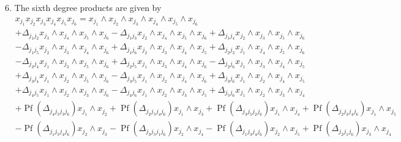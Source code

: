 \documentclass[aps, preprint]{revtex4}
\begin{document}
6. The sixth degree products are given by
\begin{align} & x_{j_{1}} x_{j_{2}} x_{j_{3}} x_{j_{4}} x_{j_{5}} x_{j_{6}} =x_{j_{1}} \wedge x_{j_{2}} \wedge x_{j_{3}} \wedge x_{j_{4}} \wedge x_{j_{5}} \wedge x_{j_{6}} \nonumber  \\
 &  + \Delta _{j_{1} j_{2}}x_{j_{3}} \wedge x_{j_{4}} \wedge x_{j_{5}} \wedge x_{j_{6}} - \Delta _{j_{1} j_{3}}x_{j_{2}} \wedge x_{j_{4}} \wedge x_{j_{5}} \wedge x_{j_{6}} + \Delta _{j_{1} j_{4}}x_{j_{2}} \wedge x_{j_{3}} \wedge x_{j_{5}} \wedge x_{j_{6}} \nonumber  \\
 &  - \Delta _{j_{1} j_{5}}x_{j_{2}} \wedge x_{j_{3}} \wedge x_{j_{4}} \wedge x_{j_{6}} + \Delta _{j_{1} j_{6}}x_{j_{2}} \wedge x_{j_{3}} \wedge x_{j_{4}} \wedge x_{j_{5}} + \Delta _{j_{2} j_{3}}x_{j_{1}} \wedge x_{j_{4}} \wedge x_{j_{5}} \wedge x_{j_{6}} \nonumber  \\
 &  - \Delta _{j_{2} j_{4}}x_{j_{1}} \wedge x_{j_{3}} \wedge x_{j_{5}} \wedge x_{j_{6}} + \Delta _{j_{2} j_{5}}x_{j_{1}} \wedge x_{j_{3}} \wedge x_{j_{4}} \wedge x_{j_{6}} - \Delta _{j_{2} j_{6}}x_{j_{1}} \wedge x_{j_{3}} \wedge x_{j_{4}} \wedge x_{j_{5}} \nonumber  \\
 &  + \Delta _{j_{3} j_{4}}x_{j_{1}} \wedge x_{j_{2}} \wedge x_{j_{5}} \wedge x_{j_{6}} - \Delta _{j_{3} j_{5}}x_{j_{1}} \wedge x_{j_{2}} \wedge x_{j_{4}} \wedge x_{j_{6}} + \Delta _{j_{3} j_{6}}x_{j_{1}} \wedge x_{j_{2}} \wedge x_{j_{4}} \wedge x_{j_{5}} \nonumber  \\
 &  + \Delta _{j_{4} j_{5}}x_{j_{1}} \wedge x_{j_{2}} \wedge x_{j_{3}} \wedge x_{j_{6}} - \Delta _{j_{4} j_{6}}x_{j_{1}} \wedge x_{j_{2}} \wedge x_{j_{3}} \wedge x_{j_{5}} + \Delta _{j_{5} j_{6}}x_{j_{1}} \wedge x_{j_{2}} \wedge x_{j_{3}} \wedge x_{j_{4}} \nonumber  \\
 &  +\ensuremath{\operatorname*{Pf}} \left ( \Delta _{j_{4} j_{5} j_{3} j_{6}}\right ) x_{j_{1}} \wedge x_{j_{2}} +\ensuremath{\operatorname*{Pf}} \left ( \Delta _{j_{2} j_{5} j_{4} j_{6}}\right ) x_{j_{1}} \wedge x_{j_{3}} +\ensuremath{\operatorname*{Pf}} \left ( \Delta _{j_{3} j_{5} j_{2} j_{6}}\right ) x_{j_{1}} \wedge x_{j_{4}} +\ensuremath{\operatorname*{Pf}} \left ( \Delta _{j_{2} j_{3} j_{4} j_{6}}\right ) x_{j_{1}} \wedge x_{j_{5}} \nonumber  \\
 &  -\ensuremath{\operatorname*{Pf}} \left ( \Delta _{j_{1} j_{5} j_{4} j_{6}}\right ) x_{j_{2}} \wedge x_{j_{3}} -\ensuremath{\operatorname*{Pf}} \left ( \Delta _{j_{3} j_{5} j_{1} j_{6}}\right ) x_{j_{2}} \wedge x_{j_{4}} -\ensuremath{\operatorname*{Pf}} \left ( \Delta _{j_{1} j_{3} j_{4} j_{6}}\right ) x_{j_{2}} \wedge x_{j_{5}} +\ensuremath{\operatorname*{Pf}} \left ( \Delta _{j_{2} j_{1} j_{6}}\right ) x_{j_{3}} \wedge x_{j_{4}} \nonumber  \\

\end{align}
\end{document}
